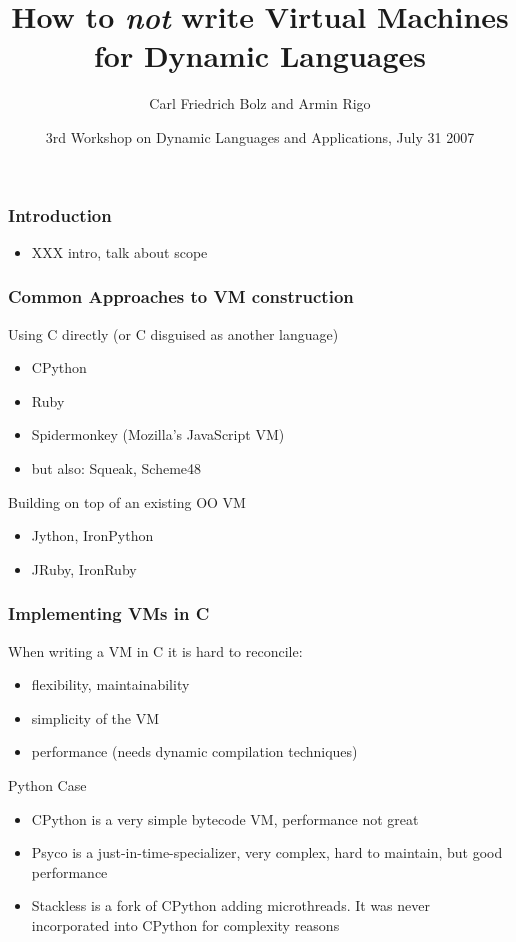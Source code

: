 \documentclass[utf8x]{beamer}
\title{How to \emph{not} write Virtual Machines for Dynamic Languages}
\author{Carl Friedrich Bolz and Armin Rigo}
\institute[Heinrich-Heine-Universität Düsseldorf]
{
  Institut für Informatik\\
  Heinrich-Heine-Universität Düsseldorf
}
\date{3rd Workshop on Dynamic Languages and Applications, July 31 2007}
\begin{document}
\begin{frame}
  \titlepage
\end{frame}


\begin{frame}
  \frametitle{Introduction}
  \begin{itemize}
  \item XXX intro, talk about scope
  \end{itemize}
\end{frame}


\begin{frame}
  \frametitle{Common Approaches to VM construction}
  \begin{block}{
    Using C directly (or C disguised as another language)}
    \begin{itemize}
    \item
      CPython
    \item
      Ruby
    \item
      Spidermonkey (Mozilla's JavaScript VM)
    \item
      but also: Squeak, Scheme48
    \end{itemize}
  \end{block}
  \begin{block}{
    Building on top of an existing OO VM}
    \begin{itemize}
    \item
      Jython, IronPython
    \item
      JRuby, IronRuby
    \end{itemize}
  \end{block}
\end{frame}

\begin{frame}
  \frametitle{Implementing VMs in C}
  When writing a VM in C it is hard to reconcile:
  \begin{itemize}
  \item
    flexibility, maintainability
  \item
    simplicity of the VM
  \item
    performance (needs dynamic compilation techniques)
  \end{itemize}
  \pause
  \begin{block}{
    Python Case}
    \begin{itemize}
    \item
      \alert{CPython} is a very simple bytecode VM, performance not great
    \item
      \alert{Psyco} is a just-in-time-specializer, very complex, hard to
      maintain, but good performance
    \item
      \alert{Stackless} is a fork of CPython adding microthreads. It was never
      incorporated into CPython for complexity reasons
    \end{itemize}
  \end{block}
\end{frame}
\end{document}
